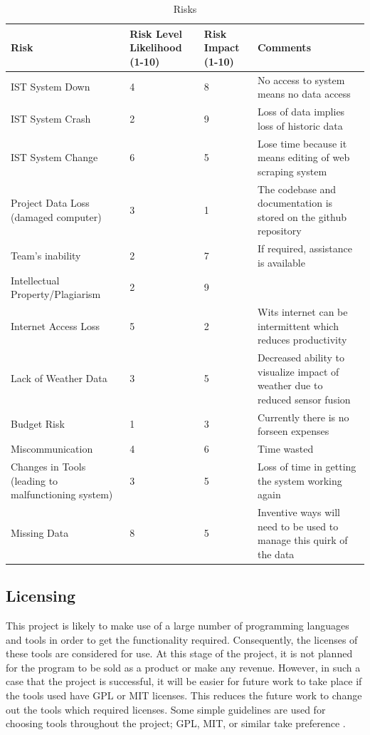 \documentclass[12pt,onecolumn]{IEEEtran}
\begin{document}
\begin{table}[!t]
\renewcommand{\arraystretch}{1.3}
\caption{Risks}
\label{tab:risks}
\centering
\begin{tabular}{p{50mm}p{15mm}p{15mm}p{80mm}}
\hline
Risk & Risk Level Likelihood (1-10) & Risk Impact (1-10) & Comments \\
\hline
IST System Down & 4 & 8 & No access to system means no data access \\
IST System Crash & 2 & 9 & Loss of data implies loss of historic data \\
IST System Change & 6 & 5 & Lose time because it means editing of web scraping system \\
Project Data Loss (damaged computer) & 3 & 1 & The codebase and documentation is stored on the github repository \\
Team's inability & 2 & 7 & If required, assistance is available \\
Intellectual Property/Plagiarism & 2 & 9 &  \\
Internet Access Loss & 5 & 2 & Wits internet can be intermittent which reduces productivity \\
Lack of Weather Data & 3 & 5 & Decreased ability to visualize impact of weather due to reduced sensor fusion \\
Budget Risk & 1 & 3 & Currently there is no forseen expenses \\
Miscommunication & 4 & 6 & Time wasted \\
Changes in Tools (leading to malfunctioning system) & 3 & 5 & Loss of time in getting the system working again \\
Missing Data & 8 & 5 & Inventive ways will need to be used to manage this quirk of the data \\
\hline
\end{tabular}
\end{table}

\subsection{Licensing} \label{sec:Licensing}
This project is likely to make use of a large number of programming languages and tools in order to get the functionality required. Consequently, the licenses of these tools are considered for use. At this stage of the project, it is not planned for the program to be sold as a product or make any revenue.
However, in such a case that the project is successful, it will be easier for future work to take place if the tools used have GPL or MIT licenses. This reduces the future work to change out the tools which required licenses. Some simple guidelines are used for choosing tools throughout the project; GPL, MIT, or similar take preference \cite{yegor}.
\end{document}
